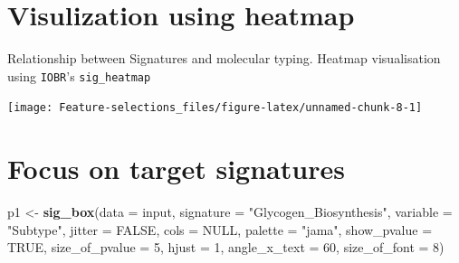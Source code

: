 \documentclass[
  12pt,
]{book}
\newenvironment{Shaded}{\begin{snugshade}}{\end{snugshade}}
\newcommand{\AttributeTok}[1]{\textcolor[rgb]{0.13,0.29,0.53}{#1}}
\newcommand{\ConstantTok}[1]{\textcolor[rgb]{0.56,0.35,0.01}{#1}}
\newcommand{\DecValTok}[1]{\textcolor[rgb]{0.00,0.00,0.81}{#1}}
\newcommand{\FunctionTok}[1]{\textcolor[rgb]{0.13,0.29,0.53}{\textbf{#1}}}
\newcommand{\NormalTok}[1]{#1}
\newcommand{\OtherTok}[1]{\textcolor[rgb]{0.56,0.35,0.01}{#1}}
\newcommand{\SpecialCharTok}[1]{\textcolor[rgb]{0.81,0.36,0.00}{\textbf{#1}}}
\newcommand{\StringTok}[1]{\textcolor[rgb]{0.31,0.60,0.02}{#1}}
\begin{document}
\hypertarget{visulization-using-heatmap}{%
\section{Visulization using heatmap}\label{visulization-using-heatmap}}

Relationship between Signatures and molecular typing.
Heatmap visualisation using \texttt{IOBR}'s \texttt{sig\_heatmap}

\begin{Shaded}
\end{Shaded}

\begin{center}\texttt{[image: Feature-selections\_files/figure-latex/unnamed-chunk-8-1]} \end{center}

\hypertarget{focus-on-target-signatures}{%
\section{Focus on target signatures}\label{focus-on-target-signatures}}

\begin{Shaded}
\begin{Highlighting}[]
\NormalTok{p1 }\OtherTok{\textless{}{-}} \FunctionTok{sig\_box}\NormalTok{(}\AttributeTok{data           =}\NormalTok{ input, }
              \AttributeTok{signature      =} \StringTok{"Glycogen\_Biosynthesis"}\NormalTok{,}
              \AttributeTok{variable       =} \StringTok{"Subtype"}\NormalTok{,}
              \AttributeTok{jitter         =} \ConstantTok{FALSE}\NormalTok{,}
              \AttributeTok{cols           =}  \ConstantTok{NULL}\NormalTok{,}
              \AttributeTok{palette        =} \StringTok{"jama"}\NormalTok{,}
              \AttributeTok{show\_pvalue    =} \ConstantTok{TRUE}\NormalTok{,}
              \AttributeTok{size\_of\_pvalue =} \DecValTok{5}\NormalTok{,}
              \AttributeTok{hjust          =} \DecValTok{1}\NormalTok{, }
              \AttributeTok{angle\_x\_text   =} \DecValTok{60}\NormalTok{, }
              \AttributeTok{size\_of\_font   =} \DecValTok{8}\NormalTok{)}
\end{Highlighting}
\end{Shaded}
\end{document}
